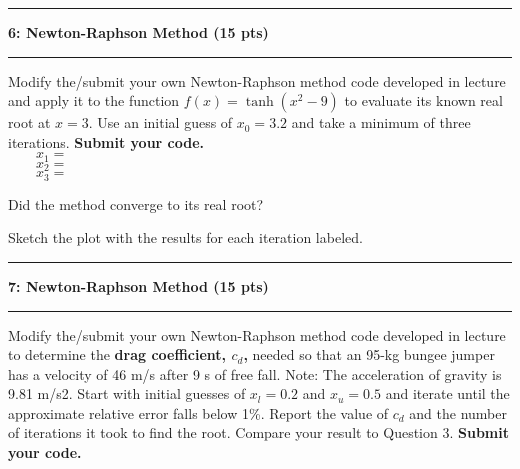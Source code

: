 \documentclass[11pt]{article}
\newcommand\question[2]{\vspace{.25in}\hrule\textbf{#1: #2}\vspace{.5em}\hrule\vspace{.10in}}
\begin{document}
\newpage
\question{6}{Newton-Raphson Method (15 pts)}
Modify the/submit your own Newton-Raphson method code developed in lecture and apply it to the function $f(x) = \tanh(x^2-9)$ to evaluate its known real root at $x = 3$. Use an initial guess of $x_0 = 3.2$ and take a minimum of three iterations. \textbf{Submit your code.}\\
\vspace{6pt}
$\qquad x_1 =$ \\\vspace{6pt}
$\qquad x_2 =$ \\\vspace{6pt}
$\qquad x_3 =$ \\\vspace{6pt}

Did the method converge to its real root? \\\vspace{1cm}


Sketch the plot with the results for each iteration labeled.
\vspace{6cm}


\question{7}{Newton-Raphson Method (15 pts)}
Modify the/submit your own Newton-Raphson method code developed in lecture to determine the \textbf{drag coefficient, $c_d$,} needed
so that an 95-kg bungee jumper has a velocity of 46 m/s after
9 s of free fall. Note: The acceleration of gravity is 9.81 m/s2.
Start with initial guesses of $x_l = 0.2$ and $x_u = 0.5$ and iterate
until the approximate relative error falls below 1\%. Report the value of $c_d$ and the number of iterations it took to find the root. Compare your result to Question 3. \textbf{Submit your code.}
\end{document}
